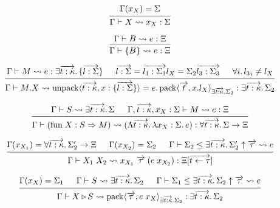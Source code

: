 \documentclass[lualatex,12pt,unicode]{article}
\begin{document}
\pagestyle{empty}

\[
    \begin{prooftree}
        \hypo{\Gamma(x_X) = \Sigma}
        \infer1{\Gamma \vdash X \rightsquigarrow x_X: \Sigma}
    \end{prooftree}
\]

\[
    \begin{prooftree}
        \hypo{\Gamma \vdash B \rightsquigarrow e: \Xi}
        \infer1{\Gamma \vdash \{B\} \rightsquigarrow e: \Xi}
    \end{prooftree}
\]

\[
    \begin{prooftree}
        \hypo{\Gamma \vdash M \rightsquigarrow e: \exists \overrightarrow{t: \kappa}\ldotp \{\overrightarrow{l: \Sigma}\}}
        \hypo{\overrightarrow{l: \Sigma} = \overrightarrow{l_1: \Sigma_1} l_X = \Sigma_2 \overrightarrow{l_3: \Sigma_3}}
        \hypo{\forall i\ldotp {l_3}_i \neq l_X}
        \infer3{\Gamma \vdash M.X \rightsquigarrow \mathrm{unpack}\langle \overrightarrow{t: \kappa}, x: \{\overrightarrow{l: \Sigma}\}\rangle = e\ldotp \mathrm{pack}\langle \overrightarrow{t}, x.l_X\rangle_{\exists \overrightarrow{t: \kappa}\ldotp \Sigma_2}: \exists \overrightarrow{t: \kappa}\ldotp \Sigma_2}
    \end{prooftree}
\]

\[
    \begin{prooftree}
        \hypo{\Gamma \vdash S \rightsquigarrow \exists \overrightarrow{t: \kappa}\ldotp \Sigma}
        \hypo{\Gamma, \overrightarrow{t: \kappa}, x_X: \Sigma \vdash M \rightsquigarrow e: \Xi}
        \infer2{\Gamma \vdash (\mathrm{fun}\; X: S \Rightarrow M) \rightsquigarrow (\Lambda \overrightarrow{t: \kappa}\ldotp \lambda x_X: \Sigma\ldotp e): \forall \overrightarrow{t: \kappa}\ldotp \Sigma \to \Xi}
    \end{prooftree}
\]

\[
    \begin{prooftree}
        \hypo{\Gamma(x_{X_1}) = \forall \overrightarrow{t: \kappa}\ldotp \Sigma_2' \to \Xi}
        \hypo{\Gamma(x_{X_2}) = \Sigma_2}
        \hypo{\Gamma \vdash \Sigma_2 \leq \exists \overrightarrow{t: \kappa}\ldotp \Sigma_2' \uparrow \overrightarrow{\tau} \rightsquigarrow e}
        \infer3{\Gamma \vdash X_1\; X_2 \rightsquigarrow x_{X_1}\; \overrightarrow{\tau}\; (e\; x_{X_2}): \Xi[\overrightarrow{t \leftarrow \tau}]}
    \end{prooftree}
\]

\[
    \begin{prooftree}
        \hypo{\Gamma(x_X) = \Sigma_1}
        \hypo{\Gamma \vdash S \rightsquigarrow \exists \overrightarrow{t: \kappa}\ldotp \Sigma_2}
        \hypo{\Gamma \vdash \Sigma_1 \leq \exists \overrightarrow{t: \kappa}\ldotp \Sigma_2 \uparrow \overrightarrow{\tau} \rightsquigarrow e}
        \infer3{\Gamma \vdash X \triangleright S \rightsquigarrow \mathrm{pack}\langle \overrightarrow{\tau}, e\; x_X\rangle_{\exists \overrightarrow{t: \kappa}\ldotp \Sigma_2}: \exists \overrightarrow{t: \kappa}\ldotp \Sigma_2}
    \end{prooftree}
\]
\end{document}
